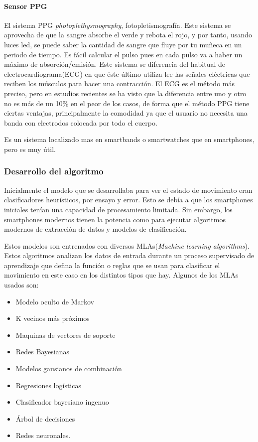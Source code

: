 \documentclass[12pt]{article}
\numberwithin{equation}{section}
\begin{document}
\paragraph{Sensor PPG}
El sistema PPG \textit{photoplethysmography}, fotopletismografía. Este sistema se aprovecha de que la sangre absorbe el verde y rebota el rojo, y por tanto, usando luces led, se puede saber la cantidad de sangre que fluye por tu muñeca en un periodo de tiempo. Es fácil calcular el pulso pues en cada pulso va a haber un máximo de absorción/emisión. Este sistema se diferencia del habitual de electrocardiograma(ECG) en que éste último utiliza lee las señales eléctricas que reciben los músculos para hacer una contracción. El ECG es el método más preciso, pero en estudios recientes se ha visto que la diferencia entre uno y otro no es más de un 10\% \cite{77489867} en el peor de los casos, de forma que el método PPG tiene ciertas ventajas, principalmente la comodidad ya que el usuario no necesita una banda con electrodos colocada por todo el cuerpo.

Es un sistema localizado mas en smartbands o smartwatches que en smartphones, pero es muy útil.

\subsubsection{Desarrollo del algoritmo}
Inicialmente el modelo que se desarrollaba para ver el estado de movimiento eran clasificadores heurísticos, por ensayo y error. Esto se debía a que los smartphones iniciales tenían una capacidad de procesamiento limitada. Sin embargo, los smartphones modernos tienen la potencia como para ejecutar algoritmos modernos de extracción de datos y modelos de clasificación.

Estos modelos son entrenados con diversos MLAs(\textit{Machine learning algorithms}). Estos algoritmos analizan los datos de entrada durante un proceso supervisado de aprendizaje que defina la función o reglas que se usan para clasificar el movimiento en este caso en los distintos tipos que hay. Algunos de los MLAs usados son:

\begin{itemize}
\item Modelo oculto de Markov
\item K vecinos más próximos
\item Maquinas de vectores de soporte
\item Redes Bayesianas
\item Modelos gausianos de combinación
\item Regresiones logísticas
\item Clasificador bayesiano ingenuo
\item Árbol de decisiones
\item Redes neuronales.
\end{itemize}
\end{document}
